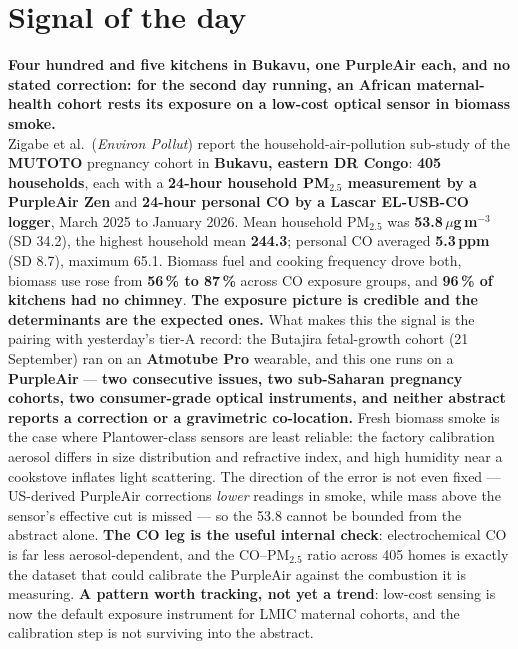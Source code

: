 \documentclass[10pt]{article}
\begin{document}
\vspace{6mm}

\section*{\sffamily\bfseries\color{Deep}Signal of the day}
\vspace{-1.5mm}{\color{Amber}\rule{\linewidth}{1.1pt}}\vspace{2.5mm}

\begin{keybox}
{\sffamily\bfseries\small\color{Deep}Four hundred and five kitchens in Bukavu, one
PurpleAir each, and no stated correction: for the second day running, an African
maternal-health cohort rests its exposure on a low-cost optical sensor in biomass smoke.}\\[1.4mm]
\footnotesize
Zigabe et al.\ (\textit{Environ Pollut}) report the household-air-pollution sub-study of
the \textbf{MUTOTO} pregnancy cohort in \textbf{Bukavu, eastern DR Congo}: \textbf{405
households}, each with a \textbf{24-hour household PM$_{2.5}$ measurement by a PurpleAir
Zen} and \textbf{24-hour personal CO by a Lascar EL-USB-CO logger}, March 2025 to January
2026. Mean household PM$_{2.5}$ was \textbf{53.8\,$\mu$g\,m$^{-3}$} (SD 34.2), the highest
household mean \textbf{244.3}; personal CO averaged \textbf{5.3\,ppm} (SD 8.7), maximum
65.1. Biomass fuel and cooking frequency drove both, biomass use rose from \textbf{56\,\%
to 87\,\%} across CO exposure groups, and \textbf{96\,\% of kitchens had no chimney}.
\textbf{The exposure picture is credible and the determinants are the expected ones.}
What makes this the signal is the pairing with yesterday's tier-A record: the Butajira
fetal-growth cohort (21 September) ran on an \textbf{Atmotube Pro} wearable, and this one
runs on a \textbf{PurpleAir} --- \textbf{two consecutive issues, two sub-Saharan pregnancy
cohorts, two consumer-grade optical instruments, and neither abstract reports a correction
or a gravimetric co-location.} Fresh biomass smoke is the case where Plantower-class
sensors are least reliable: the factory calibration aerosol differs in size distribution
and refractive index, and high humidity near a cookstove inflates light scattering. The
direction of the error is not even fixed --- US-derived PurpleAir corrections
\textit{lower} readings in smoke, while mass above the sensor's effective cut is missed ---
so the 53.8 cannot be bounded from the abstract alone. \textbf{The CO leg is the useful
internal check}: electrochemical CO is far less aerosol-dependent, and the CO--PM$_{2.5}$
ratio across 405 homes is exactly the dataset that could calibrate the PurpleAir against
the combustion it is measuring. \textbf{A pattern worth tracking, not yet a trend}: low-cost
sensing is now the default exposure instrument for LMIC maternal cohorts, and the
calibration step is not surviving into the abstract.\par
\end{keybox}
\end{document}

